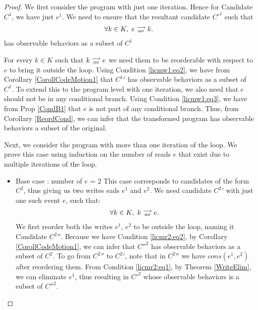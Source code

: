 \begin{proof}


    We first consider the program with just one iteration. Hence for Candidate $C^1$, we have just $e^1$. 
    We need to ensure that the resultant candidate $C'^1$ such that 
    \begin{align*}
        \forall k \in K, \ e\stackrel{\longrightarrow}{_{ao}}k.
    \end{align*}  
    has observable behaviors as a subset of $C^1$

    For every $k \in K$ such that $k\stackrel{\longrightarrow}{_{ao}}e$ we need them to be reorderable with respect to $e$ to bring it outside the loop.
    Using Condition \ref{licmw1:eq2}, we have from Corollary \ref{CorollCodeMotion1} that $C^1'$ has observable behaviors as a subset of $C^1$.
    To extend this to the program level with one iteration, we also need that $e$ should not be in any conditional branch.
    Using Condition \ref{licmw1:eq3}, we have from Prop \ref{CondB1} that $e$ is not part of any conditional branch.
    Thus, from Corollary \ref{ReordCond}, we can infer that the transformed program has observable behaviors a subset of the original.  
    
    Next, we consider the program with more than one iteration of the loop. 
    We prove this case using induction on the number of reads $e$ that exist due to multiple iterations of the loop. 
    \begin{itemize}

        \item Base case : number of $e$ = 2
        This case corresponds to candidates of the form $C^2$, thus giving us two writes eads $e^1$ and $e^2$.
        We need candidate $C^2'$ with just one such event $e$, such that:
        \begin{align*}
            \forall k \in K, \ k\stackrel{\longrightarrow}{_{ao}}e.
        \end{align*}  
        We first reorder both the writes $e^1$, $e^2$ to be outside the loop, naming it Candidate $C^2''$.
        Because we have Condition \ref{licmr2:eq2}, by Corollary \ref{CorollCodeMotion1}, we can infer that $C''^2$ has observable behaviors as a subset of $C^2$.
        To go from $C^2''$ to $C^2'$, note that in $C^2''$ we have $cons(e^1, e^2)$ after reordering them. 
        From Condition \ref{licmr2:eq1}, by Theorem \ref{WriteElim}, we can eliminate $e^1$, thus resulting in $C'^2$ whose observable behaviors is a subset of $C''^2$\footnotemark.

        

\end{itemize}
\end{proof}
